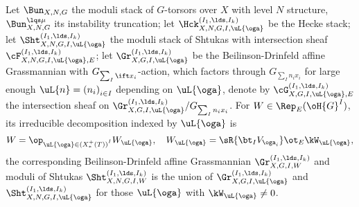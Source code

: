 \documentclass[article, a4paper, twoside]{universal}
\begin{document}
\begin{stp}
	Let $\Bun_{X,N,G}$ the moduli stack of $G$-torsors over $X$ with level $N$ structure, $\Bun_{X,N,G}^{\lqs\mu}$ its instability truncation; let $\Hck_{X,N,G,I,\uL{\oga}}^{(I_{1},\lds,I_{k})}$ be the Hecke stack; let $\Sht_{X,N,G,I,\uL{\oga}}^{(I_{1},\lds,I_{k})}$ the moduli stack of Shtukas with intersection sheaf $\cF_{X,N,G,I,\uL{\oga},E}^{(I_{1},\lds,I_{k})}$; let $\Gr_{X,G,I,\uL{\oga}}^{(I_{1},\lds,I_{k})}$ be the Beilinson-Drinfeld affine Grassmannian with $G_{\sum_{I}\ift x_{i}}$-action, which factors through $G_{\sum_{I}n_{i}x_{i}}$ for large enough $\uL{n}={(n_{i})}_{i\in I}$ depending on $\uL{\oga}$, denote by $\cG_{X,G,I,\uL{\oga},E}^{(I_{1},\lds,I_{k})}$ the intersection sheaf on $\Gr_{X,G,I,\uL{\oga}}^{(I_{1},\lds,I_{k})}/G_{\sum_{I}n_{i}x_{i}}$. For $W\in\Rep_{E}(\oH{G}^{I})$, its irreducible decomposition indexed by $\uL{\oga}$ is
		\[
			W=\op_{\uL{\oga}\in {(X_{*}^{+}(T))}^{I}}W_{\uL{\oga}},\quad W_{\uL{\oga}}=\sR{\bt_{I}V_{\oga_{i}}}\ot_{E}\kW_{\uL{\oga}},
		\]
	the corresponding Beilinson-Drinfeld affine Grassmannian $\Gr_{X,G,I,W}^{(I_{1},\lds,I_{k})}$ and moduli of Shtukas $\Sht_{X,N,G,I,W}^{(I_{1},\lds,I_{k})}$ is the union of $\Gr_{X,G,I,\uL{\oga}}^{(I_{1},\lds,I_{k})}$ and $\Sht_{X,N,G,I,\uL{\oga}}^{(I_{1},\lds,I_{k})}$ for those $\uL{\oga}$ with $\kW_{\uL{\oga}}\neq0$.
\end{stp}
\end{document}
